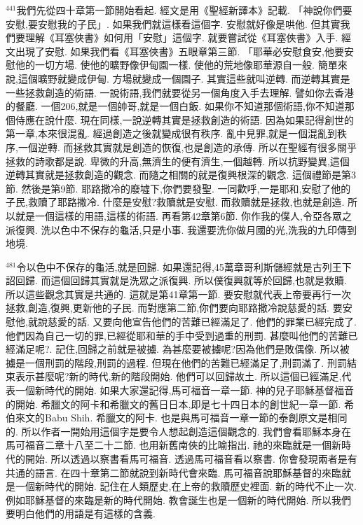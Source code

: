 \documentclass{book}
\begin{document}
$^{441}$我們先從四十章第一節開始看起.
經文是用《聖經新譯本》記載.
「神說你們要安慰,要安慰我的子民」.
如果我們就這樣看這個字.
安慰就好像是哄他.
但其實我們要理解《耳塞俠書》如何用「安慰」這個字.
就要嘗試從《耳塞俠書》入手.
經文出現了安慰.
如果我們看《耳塞俠書》五眼章第三節.
「耶華必安慰食安,他要安慰他的一切方場.
使他的曠野像伊甸園一樣.
使他的荒地像耶華源自一般.
簡單來說,這個曠野就變成伊甸.
方場就變成一個園子.
其實這些就叫逆轉.
而逆轉其實是一些拯救創造的術語.
一說術語,我們就要從另一個角度入手去理解.
譬如你去香港的餐廳.
一個206,就是一個帥哥,就是一個白飯.
如果你不知道那個術語,你不知道那個侍應在說什麼.
現在同樣,一說逆轉其實是拯救創造的術語.
因為如果記得創世的第一章,本來很混亂.
經過創造之後就變成很有秩序.
亂中見罪,就是一個混亂到秩序,一個逆轉.
而拯救其實就是創造的恢復,也是創造的承傳.
所以在聖經有很多關乎拯救的詩歌都是說.
卑微的升高,無濟生的便有濟生,一個越轉.
所以抗野變異,這個逆轉其實就是拯救創造的觀念.
而隨之相關的就是復興根深的觀念.
這個禮節是第3節.
然後是第9節.
耶路撒冷的廢墟下,你們要發聖.
一同歡呼,一是耶和,安慰了他的子民,救贖了耶路撒冷.
什麼是安慰?救贖就是安慰.
而救贖就是拯救,也就是創造.
所以就是一個這樣的用語,這樣的術語.
再看第42章第6節.
你作我的僕人,令亞各眾之派復興.
洗以色中不保存的龜活,只是小事.
我還要洗你做月國的光,洗我的九印傳到地境.

$^{481}$令以色中不保存的龜活,就是回歸.
如果還記得,45萬章哥利斯儲經就是古列王下詔回歸.
而這個回歸其實就是洗眾之派復興.
所以僕復興就等於回歸,也就是救贖.
所以這些觀念其實是共通的.
這就是第41章第一節.
要安慰就代表上帝要再行一次拯救,創造,復興,更新他的子民.
而對應第二節,你們要向耶路撒冷說慈愛的話.
要安慰他,就說慈愛的話.
又要向他宣告他們的苦難已經滿足了.
他們的罪業已經完成了.
他們因為自己一切的罪,已經從耶和華的手中受到過重的刑罰.
甚麼叫他們的苦難已經滿足呢?.
記住,回歸之前就是被擄.
為甚麼要被擄呢?因為他們是敗偶像.
所以被擄是一個刑罰的階段,刑罰的過程.
但現在他們的苦難已經滿足了,刑罰滿了.
刑罰結束表示甚麼呢?新的時代,新的階段開始.
他們可以回歸故土.
所以這個已經滿足,代表一個新時代的開始.
如果大家還記得,馬可福音一章一節.
神的兒子耶穌基督福音的開始.
希臘文的阿卡和希臘文的舊日日本,即是七十四日本的創世紀一章一節.
希伯來文的Babu Shih.
希臘文的阿卡.
也是與馬可福音一章一節的泰創原文是相同的.
所以作者一開始用這個字是要令人想起創造這個觀念的.
我們會看耶穌本身在馬可福音二章十八至二十二節.
也用新舊南俠的比喻指出.
祂的來臨就是一個新時代的開始.
所以透過以察書看馬可福音.
透過馬可福音看以察書.
你會發現兩者是有共通的語言.
在四十章第二節就說到新時代會來臨.
馬可福音說耶穌基督的來臨就是一個新時代的開始.
記住在人類歷史,在上帝的救贖歷史裡面.
新的時代不止一次.
例如耶穌基督的來臨是新的時代開始.
教會誕生也是一個新的時代開始.
所以我們要明白他們的用語是有這樣的含義.
\end{document}
